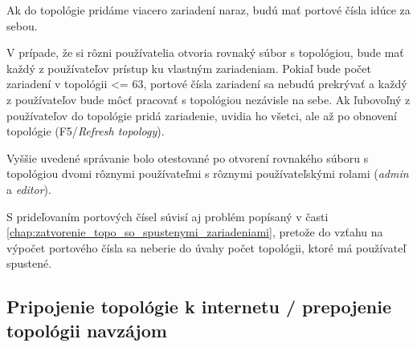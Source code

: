 Ak do topológie pridáme viacero zariadení naraz, budú mať portové čísla idúce za sebou.

V prípade, že si rôzni používatelia otvoria rovnaký súbor s topológiou, bude mať každý z používateľov prístup ku vlastným zariadeniam. Pokiaľ bude počet zariadení v topológii <= 63, portové čísla zariadení sa nebudú prekrývať a každý z používateľov bude môcť pracovať s topológiou nezávisle na sebe. Ak ľubovoľný z používateľov do topológie pridá zariadenie, uvidia ho všetci, ale až po obnovení topológie (F5/\emph{Refresh topology}).

Vyššie uvedené správanie bolo otestované po otvorení rovnakého súboru s topológiou dvomi rôznymi používateľmi s rôznymi používateľskými rolami (\emph{admin} a \emph{editor}).

S prideľovaním portových čísel súvisí aj problém popísaný v časti \ref{chap:zatvorenie_topo_so_spustenymi_zariadeniami}, pretože do vzťahu na výpočet portového čísla sa neberie do úvahy počet topológii, ktoré má používateľ spustené.


\begin{comment}
\begin{figure}
    \centering
    \texttt{[image: eve\_ng\_rovnaka\_topo\_prvy\_pouzivatel\_admin]}
    \caption{Topológia prvého používateľa s používateľskou rolou \emph{admin}}
    \label{obr:eve_ng_rovnaka_topo_prvy_pouzivatel_admin}
\end{figure}

\begin{figure}
    \centering
    \texttt{[image: eve\_ng\_rovnaka\_topo\_druhy\_pouzivatel\_editor]}
    \caption{Topológia druhého používateľa s používateľskou rolou \emph{editor}}
    \label{obr:eve_ng_rovnaka_topo_druhy_pouzivatel_editor}
\end{figure}
\end{comment}



\subsection{Pripojenie topológie k internetu / prepojenie topológii navzájom}

